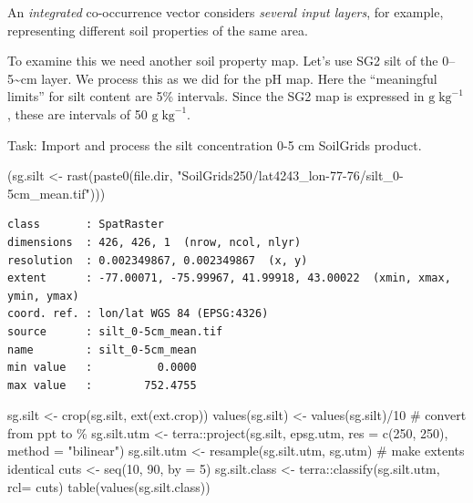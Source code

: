 \documentclass[
  letterpaper,
  DIV=11,
  numbers=noendperiod]{scrartcl}
\newenvironment{Shaded}{\begin{snugshade}}{\end{snugshade}}
\newcommand{\AttributeTok}[1]{\textcolor[rgb]{0.40,0.45,0.13}{#1}}
\newcommand{\CommentTok}[1]{\textcolor[rgb]{0.37,0.37,0.37}{#1}}
\newcommand{\DecValTok}[1]{\textcolor[rgb]{0.68,0.00,0.00}{#1}}
\newcommand{\FunctionTok}[1]{\textcolor[rgb]{0.28,0.35,0.67}{#1}}
\newcommand{\NormalTok}[1]{\textcolor[rgb]{0.00,0.23,0.31}{#1}}
\newcommand{\OtherTok}[1]{\textcolor[rgb]{0.00,0.23,0.31}{#1}}
\newcommand{\SpecialCharTok}[1]{\textcolor[rgb]{0.37,0.37,0.37}{#1}}
\newcommand{\StringTok}[1]{\textcolor[rgb]{0.13,0.47,0.30}{#1}}
\begin{document}
An \emph{integrated} co-occurrence vector considers \emph{several input
layers}, for example, representing different soil properties of the same
area.

To examine this we need another soil property map. Let's use SG2 silt of
the 0--5\textasciitilde cm layer. We process this as we did for the pH
map. Here the ``meaningful limits'' for silt content are 5\% intervals.
Since the SG2 map is expressed in \(\mathrm{g} \; \mathrm{kg}^{-1}\),
these are intervals of 50 \(\mathrm{g} \; \mathrm{kg}^{-1}\).

Task: Import and process the silt concentration 0-5 cm SoilGrids
product.

\begin{Shaded}
\begin{Highlighting}[]
\NormalTok{(sg.silt }\OtherTok{\textless{}{-}} \FunctionTok{rast}\NormalTok{(}\FunctionTok{paste0}\NormalTok{(file.dir,}
                        \StringTok{"SoilGrids250/lat4243\_lon{-}77{-}76/silt\_0{-}5cm\_mean.tif"}\NormalTok{)))}
\end{Highlighting}
\end{Shaded}

\begin{verbatim}
class       : SpatRaster 
dimensions  : 426, 426, 1  (nrow, ncol, nlyr)
resolution  : 0.002349867, 0.002349867  (x, y)
extent      : -77.00071, -75.99967, 41.99918, 43.00022  (xmin, xmax, ymin, ymax)
coord. ref. : lon/lat WGS 84 (EPSG:4326) 
source      : silt_0-5cm_mean.tif 
name        : silt_0-5cm_mean 
min value   :          0.0000 
max value   :        752.4755 
\end{verbatim}

\begin{Shaded}
\begin{Highlighting}[]
\NormalTok{sg.silt }\OtherTok{\textless{}{-}} \FunctionTok{crop}\NormalTok{(sg.silt, }\FunctionTok{ext}\NormalTok{(ext.crop))}
\FunctionTok{values}\NormalTok{(sg.silt) }\OtherTok{\textless{}{-}} \FunctionTok{values}\NormalTok{(sg.silt)}\SpecialCharTok{/}\DecValTok{10} \CommentTok{\# convert from ppt to \%}
\NormalTok{sg.silt.utm }\OtherTok{\textless{}{-}}\NormalTok{ terra}\SpecialCharTok{::}\FunctionTok{project}\NormalTok{(sg.silt, epsg.utm, }
                         \AttributeTok{res =} \FunctionTok{c}\NormalTok{(}\DecValTok{250}\NormalTok{, }\DecValTok{250}\NormalTok{), }\AttributeTok{method =} \StringTok{"bilinear"}\NormalTok{)}
\NormalTok{sg.silt.utm }\OtherTok{\textless{}{-}} \FunctionTok{resample}\NormalTok{(sg.silt.utm, sg.utm) }\CommentTok{\# make extents identical}
\NormalTok{cuts }\OtherTok{\textless{}{-}} \FunctionTok{seq}\NormalTok{(}\DecValTok{10}\NormalTok{, }\DecValTok{90}\NormalTok{, }\AttributeTok{by =} \DecValTok{5}\NormalTok{) }
\NormalTok{sg.silt.class }\OtherTok{\textless{}{-}}\NormalTok{ terra}\SpecialCharTok{::}\FunctionTok{classify}\NormalTok{(sg.silt.utm, }\AttributeTok{rcl=}\NormalTok{ cuts)}
\FunctionTok{table}\NormalTok{(}\FunctionTok{values}\NormalTok{(sg.silt.class))}
\end{Highlighting}
\end{Shaded}
\end{document}
